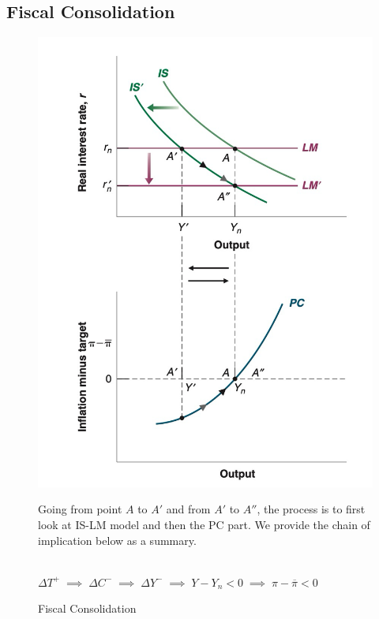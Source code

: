\documentclass{extarticle}
\begin{document}
\subsection{Fiscal Consolidation}
\begin{figure}[H] 
  \centering %
  \begin{minipage}{0.35\linewidth} 
    \centering 
    \includegraphics[width=\linewidth]{fiscal consolidation.png}
    \caption{Fiscal Consolidation} 
    \label{fig:deflation} 
  \end{minipage}%
  \begin{minipage}{0.65\linewidth}
    Going from point $A$ to $A'$ and from $A'$ to $A''$, the process is to first look at IS-LM model and then the PC part. We provide the chain of implication below as a summary.
\begin{center}
 \\
$\Delta T^+ \;\implies\; \Delta C^- \;\implies\; \Delta Y^- \;\implies\; Y - Y_n < 0 \;\implies\; \pi - \overline{\pi} < 0$ 
\end{center}


\end{minipage}
\end{figure}
\end{document}
